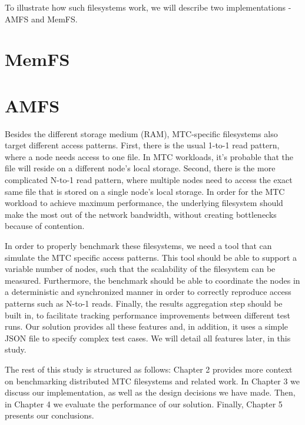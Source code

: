 To illustrate how such filesystems work, we will describe two implementations - AMFS\cite{amfs} and MemFS\cite{memfs}.

\section{MemFS}




\section{AMFS}





Besides the different storage medium (RAM), MTC-specific filesystems also target different access patterns. First, there is the usual 1-to-1 read pattern, where a node needs access to one file. In MTC workloads, it's probable that the file will reside on a different node's local storage. Second, there is the more complicated N-to-1 read pattern, where multiple nodes need to access the exact same file that is stored on a single node's local storage. In order for the MTC workload to achieve maximum performance, the underlying filesystem should make the most out of the network bandwidth, without creating bottlenecks because of contention.

In order to properly benchmark these filesystems, we need a tool that can simulate the MTC specific access patterns. This tool should be able to support a variable number of nodes, such that the scalability of the filesystem can be measured. Furthermore, the benchmark should be able to coordinate the nodes in a deterministic and synchronized manner in order to correctly reproduce access patterns such as N-to-1 reads. Finally, the results aggregation step should be built in, to facilitate tracking performance improvements between different test runs. Our solution provides all these features and, in addition, it uses a simple JSON\cite{json} file to specify complex test cases. We will detail all features later, in this study.


The rest of this study is structured as follows: Chapter 2 provides more context on benchmarking distributed MTC filesystems and related work. In Chapter 3 we discuss our implementation, as well as the design decisions we have made. Then, in Chapter 4 we evaluate the performance of our solution. Finally, Chapter 5 presents our conclusions.